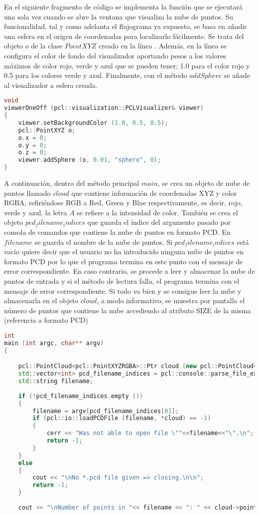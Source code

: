 En el siguiente fragmento de código se implementa la función que se ejecutará una sola vez cuando se abre la ventana que visualiza la nube de puntos. Su funcionalidad, tal y como adelanta el flujograma ya expuesto, se basa en añadir una esfera en el origen de coordenadas para localizarlo fácilmente. Se trata del objeto $o$ de la clase $PointXYZ$ creado en la línea . Además, en la línea  se configura el color de fondo del visualizador aportando pesos a los valores máximos de color rojo, verde y azul que se pueden tener; 1.0 para el color rojo y 0.5 para los colores verde y azul. Finalmente, con el método $addSphere$ se añade al visualizador a esfera creada.
\begin{lstlisting}[language=C++,breaklines]
void 
viewerOneOff (pcl::visualization::PCLVisualizer& viewer)
{
    viewer.setBackgroundColor (1.0, 0.5, 0.5);
    pcl::PointXYZ o;
    o.x = 0;
    o.y = 0;
    o.z = 0;
    viewer.addSphere (o, 0.01, "sphere", 0); 
}
\end{lstlisting}


A continuación, dentro del método principal $main$, se crea un objeto de nube de puntos llamado $cloud$ que contiene información de coordenadas XYZ y color RGBA, refiriéndose RGB a Red, Green y Blue respectivamente, es decir, rojo, verde y azul. la letra $A$ se refiere a la intensidad de color. 
También se crea el objeto $pcd_filename_indices$ que guarda el índice del argumento pasado por consola de comandos que contiene la nube de puntos en formato PCD. En $filename$ se guarda el nombre de la nube de puntos.
Si $pcd_filename_indices$ está vacío quiere decir que el usuario no ha introducido ninguna nube de puntos en formato PCD por lo que el programa termina en este punto con el mensaje de error correspondiente. En caso contrario, se procede a leer y almacenar la nube de puntos de entrada y si el método de lectura falla, el programa termina con el mensaje de error correspondiente.
Si todo va bien y se consigue leer la nube y almacenarla en el objeto $cloud$, a modo informativo, se muestra por pantalla el número de puntos que contiene la nube accediendo al atributo SIZE de la misma (referencia a formato PCD)


\begin{lstlisting}[language=C++,breaklines]
int 
main (int argc, char** argv)
{   

    pcl::PointCloud<pcl::PointXYZRGBA>::Ptr cloud (new pcl::PointCloud<pcl::PointXYZRGBA>);
    std::vector<int> pcd_filename_indices = pcl::console::parse_file_extension_argument (argc, argv, "pcd"); 
    std::string filename;
     
    if (!pcd_filename_indices.empty ())
    {
    	filename = argv[pcd_filename_indices[0]];
    	if (pcl::io::loadPCDFile (filename, *cloud) == -1)
    	{
      		cerr << "Was not able to open file \""<<filename<<"\".\n";
      		return -1;
    	}
    }
    else
    {
    	cout << "\nNo *.pcd file given => closing.\n\n";
    	return -1;
    }
    
    cout << "\nNumber of points in "<< filename << ": " << cloud->points.size() << "\n";
\end{lstlisting}

